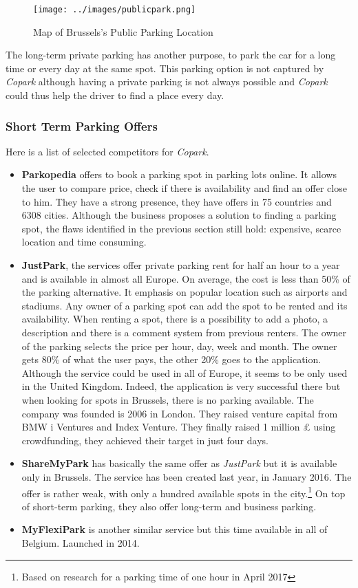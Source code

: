 \documentclass[12pt,a4paper,oneside]{book}
\newcommand{\bp}{\textit{Copark}}
\begin{document}
\begin{figure}[h]
\centering
\caption{Map of Brussels's Public Parking Location\cite{pubparkmap}}
\label{pubparcmap}
\texttt{[image: ../images/publicpark.png]}
\end{figure}

The long-term private parking has another purpose, to park the car for a long time or every day at the same spot. This parking option is not captured by \bp{} although having a private parking is not always possible and \bp{} could thus help the driver to find a place every day.

\subsubsection{Short Term Parking Offers}

Here is a list of selected competitors for \bp{}.

\begin{itemize}
\item \textbf{Parkopedia} offers to book a parking spot in parking lots online. It allows the user to compare price, check if there is availability and find an offer close to him. They have a strong presence, they have offers in 75 countries and 6308 cities. Although the business proposes a solution to finding a parking spot, the flaws identified in the previous section still hold: expensive, scarce location and time consuming.
\item \textbf{JustPark}, the services offer private parking rent for half an hour to a year and is available in almost all Europe. On average, the cost is less than 50\% of the parking alternative. It emphasis on popular location such as airports and stadiums. Any owner of a parking spot can add the spot to be rented and its availability. When renting a spot, there is a possibility to add a photo, a description and there is a comment system from previous renters. The owner of the parking selects the price per hour, day, week and month. The owner gets 80\% of what the user pays, the other 20\% goes to the application. Although the service could be used in all of Europe, it seems to be only used in the United Kingdom. Indeed, the application is very successful there but when looking for spots in Brussels, there is no parking available. The company was founded is 2006 in London. They raised venture capital from BMW i Ventures and Index Venture.\cite{bmwi,iven} They finally raised 1 million £ using crowdfunding, they achieved their target in just four days.
\item \textbf{ShareMyPark} has basically the same offer as \textit{JustPark} but it is available only in Brussels. The service has been created last year, in January 2016. The offer is rather weak, with only a hundred available spots in the city.\footnote{Based on research for a parking time of one hour in April 2017} On top of short-term parking, they also offer long-term and business parking.
\item \textbf{MyFlexiPark} is another similar service but this time available in all of Belgium. Launched in 2014.
\end{itemize}
\end{document}
